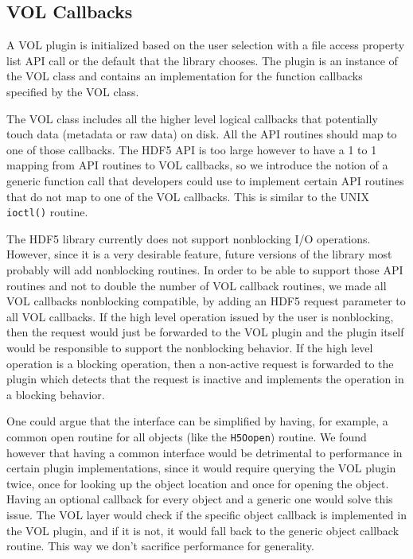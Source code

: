 \documentclass[letterpaper,hyper]{THG_RFC}
\begin{document}
\subsection{VOL Callbacks}
A VOL plugin is initialized based on the user selection with a file access property list API call or the default that the library chooses. The plugin is an instance of the VOL class and contains an implementation for the function callbacks specified by the VOL class. 

The VOL class includes all the higher level logical callbacks that potentially touch data (metadata or raw data) on disk. All the API routines should map to one of those callbacks. The HDF5 API is too large however to have a 1 to 1 mapping from API routines to VOL callbacks, so we introduce the notion of a generic function call that developers could use to implement certain API routines that do not map to one of the VOL callbacks. This is similar to the UNIX {\tt ioctl()} routine.

The HDF5 library currently does not support nonblocking I/O operations. However, since it is a very desirable feature, future versions of the library most probably will add nonblocking routines. In order to be able to support those API routines and not to double the number of VOL callback routines, we made all VOL callbacks nonblocking compatible, by adding an HDF5 request parameter to all VOL callbacks. If the high level operation issued by the user is nonblocking, then the request would just be forwarded to the VOL plugin and the plugin itself would be responsible to support the nonblocking behavior. If the high level operation is a blocking operation, then a non-active request is forwarded to the plugin which detects that the request is inactive and implements the operation in a blocking behavior. 

One could argue that the interface can be simplified by having, for example, a common open routine for all objects (like the {\tt H5Oopen}) routine. We found however that having  a common interface would be detrimental to performance in certain plugin implementations, since it would require querying the VOL plugin twice, once for looking up the object location and once for opening the object. Having an optional callback for every object and a generic one would solve this issue. The VOL layer would check if the specific object callback is implemented in the VOL plugin, and if it is not, it would fall back to the generic object callback routine. This way we don’t sacrifice performance for generality.
\end{document}
